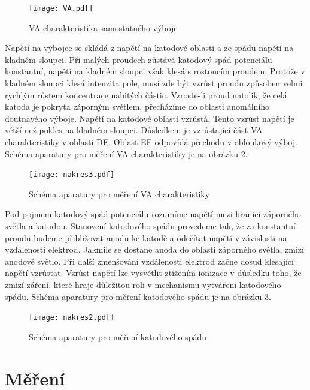 \documentclass[12pt]{article}
\begin{document}
\begin{figure}[htbp]
\begin{center}
\texttt{[image: VA.pdf]}
\caption{VA charakteristika samostatného výboje}
\label{VA}
\end{center}
\end{figure}

Napětí na výbojce se skládá z napětí na katodové oblasti a ze spádu napětí na kladném sloupci. Při malých proudech zůstává katodový spád potenciálu konstantní, napětí na kladném sloupci však klesá s rostoucím proudem. Protože v kladném sloupci klesá intenzita pole, musí zde být vzrůst proudu způsoben velmi rychlým růstem koncentrace nabitých částic. Vzroste-li proud natolik, že celá katoda je pokryta záporným světlem, přecházíme do oblasti anomálního doutnavého výboje. Napětí na katodové oblasti vzrůstá. Tento vzrůst napětí je větší než pokles na kladném sloupci. Důsledkem je vzrůstající část VA charakteristiky v oblasti DE. Oblast EF odpovídá přechodu v obloukový výboj. Schéma aparatury pro měření VA charakteristiky je na obrázku \ref{schema2}.

\begin{figure}[htbp]
\begin{center}
\texttt{[image: nakres3.pdf]}
\caption{Schéma aparatury pro měření VA charakteristiky}
\label{schema2}
\end{center}
\end{figure}

Pod pojmem katodový spád potenciálu rozumíme napětí mezi hranicí záporného světla a katodou. Stanovení katodového spádu provedeme tak, že za konstantní proudu budeme přibližovat anodu ke katodě a odečítat napětí v závislosti na vzdálenosti elektrod. Jakmile se dostane anoda do oblasti záporného světla, zmizí anodové světlo. Při další zmenšování vzdálenosti elektrod začne dosud klesající napětí vzrůstat. Vzrůst napětí lze vysvětlit ztížením ionizace v důsledku toho, že zmizí záření, které hraje důležitou roli v mechanismu vytváření katodového spádu. Schéma aparatury pro měření katodového spádu je na obrázku \ref{schema3}.


\begin{figure}[htbp]
\begin{center}
\texttt{[image: nakres2.pdf]}
\caption{Schéma aparatury pro měření katodového spádu}
\label{schema3}
\end{center}
\end{figure}



\section{Měření}
\end{document}
